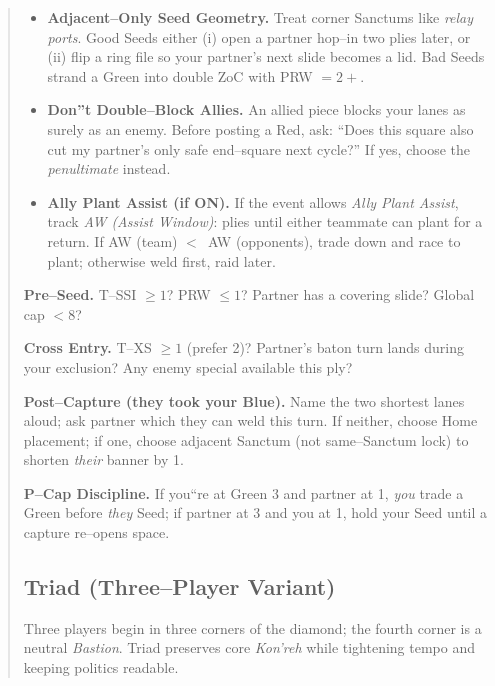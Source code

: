 \documentclass[11pt]{article}
\begin{document}
\begin{quote}
\begin{itemize}[leftmargin=1.3em,itemsep=0.3em]
  \item \textbf{Adjacent--Only Seed Geometry.}
  Treat corner Sanctums like \emph{relay ports}. Good Seeds either (i) open a partner hop--in two plies later, or (ii) flip a ring file so your partner's next slide becomes a lid. Bad Seeds strand a Green into double ZoC with PRW $=2+$.

  \item \textbf{Don''t Double--Block Allies.}
  An allied piece blocks your lanes as surely as an enemy. Before posting a Red, ask: ``Does this square also cut my partner's only safe end--square next cycle?'' If yes, choose the \emph{penultimate} instead.

  \item \textbf{Ally Plant Assist (if ON).}
  If the event allows \emph{Ally Plant Assist}, track \emph{AW (Assist Window)}: plies until either teammate can plant for a return. If AW (team) $<\,$ AW (opponents), trade down and race to plant; otherwise weld first, raid later.

\end{itemize}

\medskip
\begin{tcolorbox}[enhanced,breakable,title={Team Checklists (Say it before you move)},
  colback=white,colframe=royal,boxrule=0.8pt]
\small
\textbf{Pre--Seed.} T--SSI $\ge 1$? PRW $\le 1$? Partner has a covering slide? Global cap $<8$?

\textbf{Cross Entry.} T--XS $\ge 1$ (prefer 2)? Partner's baton turn lands during your exclusion? Any enemy special available this ply?

\textbf{Post--Capture (they took your Blue).} Name the two shortest lanes aloud; ask partner which they can weld this turn. If neither, choose Home placement; if one, choose adjacent Sanctum (not same--Sanctum lock) to shorten \emph{their} banner by 1.

\textbf{P--Cap Discipline.} If you``re at Green 3 and partner at 1, \emph{you} trade a Green before \emph{they} Seed; if partner at 3 and you at 1, hold your Seed until a capture re--opens space.
\end{tcolorbox}
\clearpage

\subsection{Triad (Three--Player Variant)}
\label{sec:triad}

\noindent Three players begin in three corners of the diamond; the fourth corner is a neutral \emph{Bastion}. Triad preserves core \emph{Kon'reh} while tightening tempo and keeping politics readable.


\end{quote}
\end{document}
